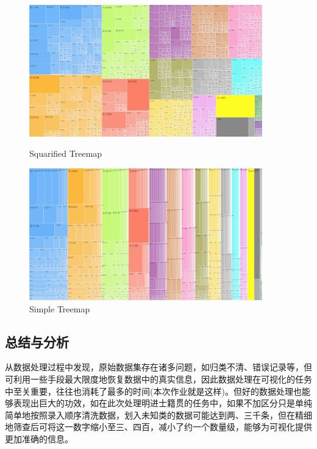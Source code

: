 \documentclass[11pt]{article}
\begin{document}
	\begin{figure}[h]
		\begin{minipage}[h]{0.5\linewidth}
			\centering
			\includegraphics[width=0.9\textwidth]{./figures/xian_squarified_treemap.png}
			\caption{Squarified Treemap}
		\end{minipage}
		\begin{minipage}[h]{0.5\linewidth}
			\centering
			\includegraphics[width=0.9\textwidth]{./figures/xian_simple_treemap.png}
			\caption{Simple Treemap}
		\end{minipage}
	\end{figure}
	
	\subsection{总结与分析}
	从数据处理过程中发现，原始数据集存在诸多问题，如归类不清、错误记录等，但可利用一些手段最大限度地恢复数据中的真实信息，因此数据处理在可视化的任务中至关重要，往往也消耗了最多的时间(本次作业就是这样)。但好的数据处理也能够表现出巨大的功效，如在此次处理明进士籍贯的任务中，如果不加区分只是单纯简单地按照录入顺序清洗数据，划入未知类的数据可能达到两、三千条，但在精细地筛查后可将这一数字缩小至三、四百，减小了约一个数量级，能够为可视化提供更加准确的信息。
	
\end{document}
